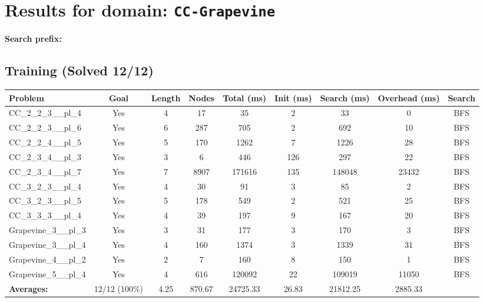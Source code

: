 \documentclass{article}
\begin{document}
\section*{Results for domain: \texttt{CC-Grapevine}}
\textbf{Search prefix:} 
\\[0.5cm]
\subsection*{Training (Solved 12/12)}
\begin{tabular}{lcccccccc}
\toprule
Problem & Goal & Length & Nodes & Total (ms) & Init (ms) & Search (ms) & Overhead (ms) & Search \\
\midrule
CC\_2\_2\_3\_\_pl\_4 & Yes & 4 & 17 & 35 & 2 & 33 & 0 & BFS \\
CC\_2\_2\_3\_\_pl\_6 & Yes & 6 & 287 & 705 & 2 & 692 & 10 & BFS \\
CC\_2\_2\_4\_\_pl\_5 & Yes & 5 & 170 & 1262 & 7 & 1226 & 28 & BFS \\
CC\_2\_3\_4\_\_pl\_3 & Yes & 3 & 6 & 446 & 126 & 297 & 22 & BFS \\
CC\_2\_3\_4\_\_pl\_7 & Yes & 7 & 8907 & 171616 & 135 & 148048 & 23432 & BFS \\
CC\_3\_2\_3\_\_pl\_4 & Yes & 4 & 30 & 91 & 3 & 85 & 2 & BFS \\
CC\_3\_2\_3\_\_pl\_5 & Yes & 5 & 178 & 549 & 2 & 521 & 25 & BFS \\
CC\_3\_3\_3\_\_pl\_4 & Yes & 4 & 39 & 197 & 9 & 167 & 20 & BFS \\
Grapevine\_3\_\_pl\_3 & Yes & 3 & 31 & 177 & 3 & 170 & 3 & BFS \\
Grapevine\_3\_\_pl\_4 & Yes & 4 & 160 & 1374 & 3 & 1339 & 31 & BFS \\
Grapevine\_4\_\_pl\_2 & Yes & 2 & 7 & 160 & 8 & 150 & 1 & BFS \\
Grapevine\_5\_\_pl\_4 & Yes & 4 & 616 & 120092 & 22 & 109019 & 11050 & BFS \\
\textbf{Averages:} & 12/12 (100\%) & 4.25 & 870.67 & 24725.33 & 26.83 & 21812.25 & 2885.33 & \\
\bottomrule
\end{tabular}
\\[0.7cm]
\end{document}
